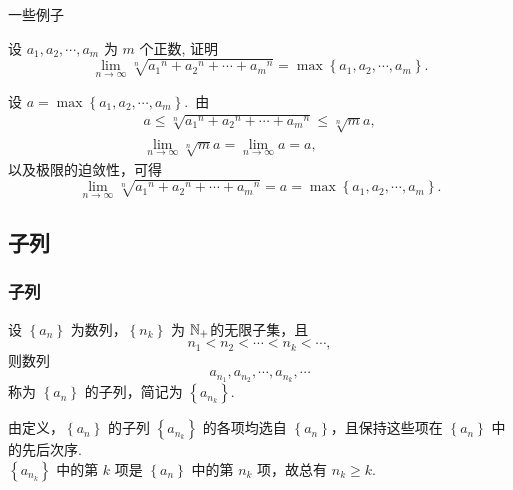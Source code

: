 \documentclass[mathserif]{beamer}
\begin{document}
\begin{frame}{一些例子}%
	\begin{ex}
		\suojin 设 $a_1, a_2, \cdots, a_m$ 为 $m$ 个正数, 证明
			$$
			\lim _{n \rightarrow \infty} \sqrt[n]{a_1{ }^n+a_2{ }^n+\cdots+a_m{ }^n}=\max \left\{a_1, a_2, \cdots, a_m\right\} .
			$$
	\end{ex}
\pause
	\begin{proofs}    
	\suojin 设 $a=\max \left\{a_1, a_2, \cdots, a_m\right\}$.\ 由
	$$
	\begin{gathered}
			a \leq \sqrt[n]{a_1{ }^n+a_2{ }^n+\cdots+a_m{ }^n} \leq \sqrt[n]{m} a, \\
			\lim _{n \rightarrow \infty} \sqrt[n]{m} a=\lim _{n \rightarrow \infty} a=a,
		\end{gathered}
	$$
	以及极限的迫敛性，可得
	$$
	\lim _{n \rightarrow \infty} \sqrt[n]{a_1{ }^n+a_2{ }^n+\cdots+a_m{ }^n}=a=\max \left\{a_1, a_2, \cdots, a_m\right\} .
	$$
	\end{proofs}
\end{frame}


\subsection{子列}

\begin{frame}
\frametitle{子列}
	\begin{dfn}
		\suojin 设 $\left\{a_n\right\}$ 为数列，$\left\{n_k\right\}$ 为 $\mathbb{N}_{+}$的无限子集，且
			$$
			n_1<n_2<\cdots<n_k<\cdots,
			$$
			则数列
			$$
			a_{n_1}, a_{n_2}, \cdots, a_{n_k}, \cdots
			$$
			称为 $\left\{a_n\right\}$ 的子列，简记为 $\left\{a_{n_k}\right\}$.
	\end{dfn}
\pause
	\begin{alertblock}{}
		\suojin {} 由定义，$\left\{a_n\right\}$ 的子列 $\left\{a_{n_k}\right\}$ 的各项均选自 $\left\{a_n\right\}$，且保持这些项在 $\left\{a_n\right\}$ 中的先后次序.\\ 
		\suojin $\left\{a_{n_k}\right\}$ 中的第 $k$ 项是 $\left\{a_n\right\}$ 中的第 $n_k$ 项，故总有 $n_k \geqslant k$. 
	\end{alertblock}
	
\end{frame}
\end{document}
